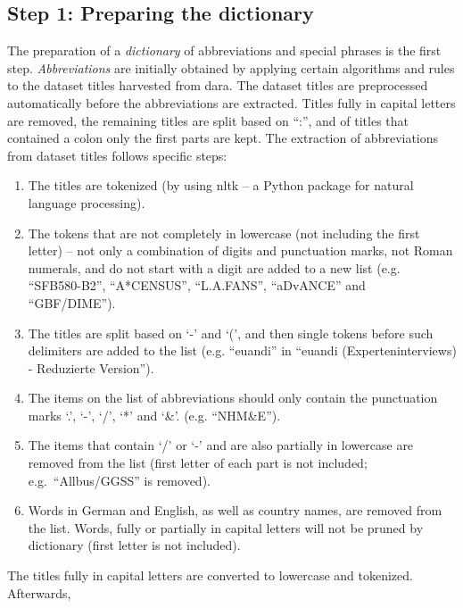 \documentclass{IOS-Book-Article}
\newcommand{\dara}{\textsf{da\textbar ra}}
\begin{document}
\subsection{Step 1: Preparing the dictionary}
\label{sec:preparing-dictionary}
The preparation of a \emph{dictionary} of abbreviations and special phrases is the first step.
\emph{Abbreviations} are initially obtained by applying certain algorithms and rules to the dataset titles harvested from {\dara}.
The dataset titles are preprocessed automatically before the abbreviations are extracted.
Titles fully in capital letters are removed, the remaining titles are split based on \enquote{:}, and of titles that contained a colon only the first parts are kept.
The extraction of abbreviations from dataset titles follows specific steps:

\begin{enumerate}
	\item The titles are tokenized (by using nltk -- a Python package for natural language processing).
	\item The tokens that are not completely in lowercase (not including the first letter) -- not only a combination of digits and punctuation marks, not Roman numerals, and do not start with a digit are added to a new list (e.g. \enquote{SFB580-B2}, \enquote{A*CENSUS}, \enquote{L.A.FANS}, \enquote{aDvANCE}
	and \enquote{GBF/DIME}).
	\item The titles are split based on `-' and `(', and then single tokens before such delimiters are added to the list (e.g. \enquote{euandi} in \enquote{euandi (Experteninterviews) - Reduzierte Version}).
	\item The items on the list of abbreviations should only contain the punctuation marks `.', `-', `/', `*' and `\&'. (e.g. \enquote{NHM\&E}).
	\item The items that contain `/' or `-' and are also partially in lowercase are removed from the list (first letter of each part is not included; e.g.\ \enquote{Allbus/GGSS} is removed). 
	\item Words in German and English, as well as country names, are removed from the list. Words, fully or partially in capital letters will not be pruned by dictionary (first letter is not included).
\end{enumerate}
The titles fully in capital letters are converted to lowercase and tokenized.
Afterwards, %
\end{document}
